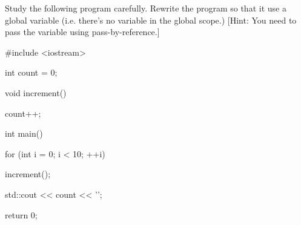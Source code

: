 Study the following program carefully. Rewrite the program so that it  use a global variable (i.e. there's no variable in the global scope.) [Hint: You need to pass the variable using pass-by-reference.]



\begin{consolethree}[escapeinside=||]

#include <iostream>



int count = 0;



void increment()

{

    count++;

}



int main()

{

    for (int i = 0; i < 10; ++i)

    {

        increment();

    }

    std::cout << count << '\n';

    return 0;

}

\end{consolethree}


